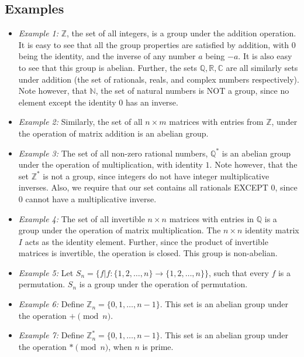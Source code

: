 \subsection{Examples}
\begin{itemize}
  \item \emph{Example 1:} $\mathbb{Z}$, the set of all integers, is a group under the addition operation.
    It is easy to see that all the group properties are satisfied by addition, with $0$ being the identity, and the inverse of any number $a$ being $-a$.
    It is also easy to see that this group is abelian.
    Further, the sets $\mathbb{Q}, \mathbb{R}, \mathbb{C}$ are all similarly sets under addition (the set of rationals, reals, and complex numbers respectively). \\
    Note however, that $\mathbb{N}$, the set of natural numbers is NOT a group, since no element except the identity $0$ has an inverse.
  \item \emph{Example 2:} Similarly, the set of all $n \times m$ matrices with entries from $\mathbb{Z}$, under the operation of matrix addition is an abelian group.
  \item \emph{Example 3:} The set of all non-zero rational numbers, $\mathbb{Q^{*}}$ is an abelian group under the operation of multiplication, with identity $1$.
    Note however, that the set $\mathbb{Z^{*}}$ is not a group, since integers do not have integer multiplicative inverses.
    Also, we require that our set contains all rationals EXCEPT $0$, since $0$ cannot have a multiplicative inverse.
  \item \emph{Example 4:} The set of all invertible $n \times n$ matrices with entries in $\mathbb{Q}$ is a group under the operation of matrix multiplication.
    The $n \times n$ identity matrix $I$ acts as the identity element.
    Further, since the product of invertible matrices is invertible, the operation is closed.
    This group is non-abelian.
  \item \emph{Example 5:} Let $S_{n} = \{f | f:\{1, 2, \dots , n\} \rightarrow \{1, 2, \dots , n\}\}$, such that every $f$ is a permutation.
    $S_{n}$ is a group under the operation of permutation.
  \item \emph{Example 6:} Define $\mathbb{Z}_{n} = \{0, 1, \dots ,n - 1\}$.
    This set is an abelian group under the operation $+ \pmod{n}$.
  \item \emph{Example 7:} Define $\mathbb{Z}_{n}^{*} = \{0, 1, \dots ,n - 1\}$.
    This set is an abelian group under the operation $* \pmod{n}$, when $n$ is prime.\\

\end{itemize}
